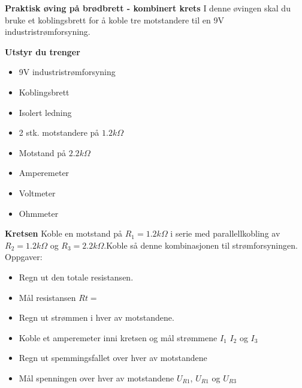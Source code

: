 

\large \textbf{Praktisk øving på brødbrett - kombinert krets }
\normalsize 
\vskip 10pt 
I denne øvingen skal du bruke et koblingsbrett for å koble tre motstandere til en 9V industristrømforsyning.

\vskip 10pt 
\large \textbf{Utstyr du trenger}

\vskip 10pt 
\begin{itemize}[noitemsep]

\item 9V industristrømforsyning
\item Koblingsbrett
\item Isolert ledning
\item 2 stk. motstandere på $1.2k\Omega$
\item Motstand på $2.2k\Omega$
\item Amperemeter
\item Voltmeter
\item Ohmmeter
\end{itemize}


\large \textbf{Kretsen}
\normalsize
\vskip 10pt 
Koble en motstand på $R_{1}=1.2k\Omega$ i serie med parallellkobling av $R_{2}=1.2k\Omega$ og $R_{3}=2.2k\Omega$.Koble så denne kombinasjonen til strømforsyningen. 
Oppgaver:
\begin{itemize}[noitemsep]
	\item Regn ut den totale resistansen.
	\item Mål resistansen $R{t}=$
	\item Regn ut strømmen i hver av motstandene.
	\item Koble et amperemeter inni kretsen og mål strømmene $I_1$ $I_2$ og $I_3$
	\item Regn ut spemmingsfallet over hver av motstandene
	\item Mål spenningen over hver av motstandene $U_{R1}$, $U_{R1}$ og $U_{R3}$
\end{itemize}




















